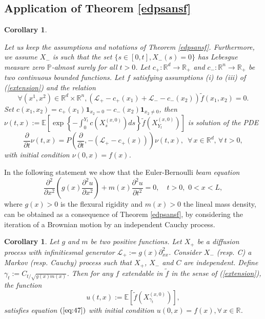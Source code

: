 \documentclass[a4paper, 11pt]{article}
\newtheorem{corol}[prop]{Corollary}
\renewcommand{\P}{\mathbb{P}}
\newcommand{\R}{\mathbb{R}}
\newcommand{\E}{\mathbb{E}}
\newcommand{\1}{\mathbf{1}}
\begin{document}
\subsection{Application of Theorem \ref{edpsansf}}


\begin{corol}\label{FKwithkilling}

Let us keep the assumptions and notations of Theorem \ref{edpsansf}. Furthermore, we assume $X_-$ is such that the set $\{s\in [0,t], X_-(s)=0\}$ has Lebesgue measure zero $\P$-almost surely for all $t>0$. Let $c_+:\R^d\rightarrow\R_+$ and $c_-:\R^n\rightarrow\R_+$ be two continuous bounded functions. Let $f$ satisfying assumptions (i) to (iii) of (\ref{extension}) and the relation 
$$\forall (x^1,x^2)\in \R^d\times\R^n, (\mathcal{L_+}-c_+(x_1)+\mathcal{L_-}-c_-(x_2))\tilde{f}(x_1,x_2)=0.$$
Set $c(x_1,x_2)=c_+(x_1)\1_{x_2=0}-c_-(x_2)\1_{x_2\neq 0}$, then \\$\nu(t,x):=\E \left[ \exp \left\{ -\int_0^{Y_t} c(X^{(x,0)}_s)ds\right\}\tilde{f}(X^{(x,0)}_{Y_t})\right]$ is solution of the PDE
\begin{equation}\label{FKkilling}
\frac{\partial}{\partial t}\nu(t,x)=P(\frac{\partial}{\partial t},-(\mathcal{L}_+-c_+(x)))\nu(t,x), \, \, \, \forall \, x\in \R^d,\, \forall\,  t>0,
\end{equation}
with initial condition $\nu(0,x)=f(x)$.


\end{corol}


\bigskip

\noindent In the following statement we show that the Euler-Bernoulli {\it beam equation}
\begin{equation}
\label{eq:47}
\frac{\partial^2}{\partial x^2}\left(g(x)\frac{\partial^2u}{\partial x^2}\right)+m(x)\frac{\partial^2 u}{\partial t^2}=0, \quad t>0,\, \,  0<x<L,
\end{equation}
where $g(x)>0$ is the flexural rigidity and $m(x)>0$ the lineal mass density, can be obtained as a consequence of Theorem \ref{edpsansf}, by considering the iteration of a Brownian motion by an independent Cauchy process.





\begin{corol}\label{beam}
Let $g$ and $m$ be two positive functions. Let $X_+$ be a diffusion process with infinitiesmal generator $\mathcal{L}_+:=g(x)\partial_{xx}^2$. Consider $X_-$ (resp. C) a Markov (resp. Cauchy) process such that $X_+$, $X_-$ and $C$ are independent. Define $\gamma_t:=C_{t/\sqrt{g(x)m(x)}}$. Then for any $f$ extendable in $\tilde{f}$ in the sense of (\ref{extension}), the function 
\begin{equation*}
u(t,x):=\E[\tilde{f}(X^{(x,0)}_{\gamma_t})],
\end{equation*}
satisfies equation $(\ref{eq:47})$ with initial condition $u(0,x)=f(x), \forall \, x\in \R$. 
\end{corol}
\end{document}
